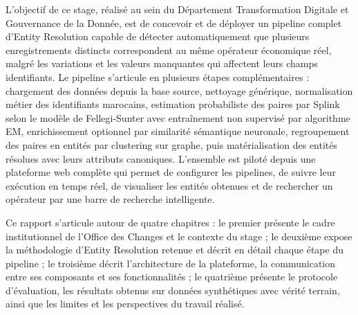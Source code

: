 L'objectif de ce stage, réalisé au sein du Département Transformation Digitale et Gouvernance de la Donnée, est de concevoir et de déployer un pipeline complet d'Entity Resolution capable de détecter automatiquement que plusieurs enregistrements distincts correspondent au même opérateur économique réel, malgré les variations et les valeurs manquantes qui affectent leurs champs identifiants. Le pipeline s'articule en plusieurs étapes complémentaires : chargement des données depuis la base source, nettoyage générique, normalisation métier des identifiants marocains, estimation probabiliste des paires par Splink selon le modèle de Fellegi-Sunter avec entraînement non supervisé par algorithme EM, enrichissement optionnel par similarité sémantique neuronale, regroupement des paires en entités par clustering sur graphe, puis matérialisation des entités résolues avec leurs attributs canoniques. L'ensemble est piloté depuis une plateforme web complète qui permet de configurer les pipelines, de suivre leur exécution en temps réel, de visualiser les entités obtenues et de rechercher un opérateur par une barre de recherche intelligente.

Ce rapport s'articule autour de quatre chapitres : le premier présente le cadre institutionnel de l'Office des Changes et le contexte du stage ; le deuxième expose la méthodologie d'Entity Resolution retenue et décrit en détail chaque étape du pipeline ; le troisième décrit l'architecture de la plateforme, la communication entre ses composants et ses fonctionnalités ; le quatrième présente le protocole d'évaluation, les résultats obtenus sur données synthétiques avec vérité terrain, ainsi que les limites et les perspectives du travail réalisé.
